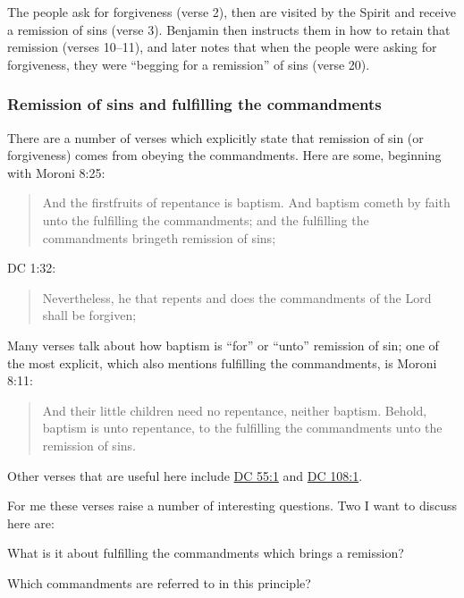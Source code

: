 		The people ask for forgiveness (verse 2), then are visited by the Spirit and receive a remission of sins (verse 3). Benjamin then instructs them in how to retain that remission (verses 10--11), and later notes that when the people were asking for forgiveness, they were ``begging for a remission'' of sins (verse 20).
		
	\subsubsection{Remission of sins and fulfilling the commandments}
		\label{REMISSION-commandments}
		
		There are a number of verses which explicitly state that remission of sin (or forgiveness) comes from obeying the commandments. Here are some, beginning with Moroni 8:25:
		
			\begin{quote}
				And the firstfruits of repentance is baptism. And baptism cometh by faith unto the fulfilling the commandments; and the fulfilling the commandments bringeth remission of sins;
			\end{quote}
			
		DC 1:32:
		
			\begin{quote}
				Nevertheless, he that repents and does the commandments of the Lord shall be forgiven;
			\end{quote}
			
		Many verses talk about how baptism is ``for'' or ``unto'' remission of sin; one of the most explicit, which also mentions fulfilling the commandments, is Moroni 8:11: 
		
			\begin{quote}
				And their little children need no repentance, neither baptism. Behold, baptism is unto repentance, to the fulfilling the commandments unto the remission of sins.
			\end{quote}
			
		Other verses that are useful here include \hyperref[DC55-1]{DC 55:1} and \hyperref[DC108-1]{DC 108:1}.
		
		For me these verses raise a number of interesting questions. Two I want to discuss here are:
		
			\begin{compactenum}
				\item What is it about fulfilling the commandments which brings a remission? 
				\item Which commandments are referred to in this principle?
			\end{compactenum}
			
